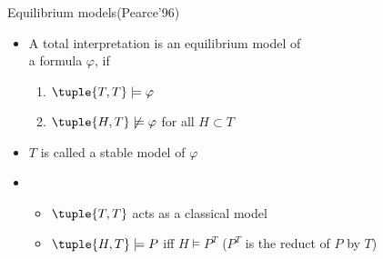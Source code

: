 \begin{frame}{Equilibrium models}{(Pearce'96)}
  \begin{itemize}
  \item A total interpretation  is an \alert{equilibrium model} of\\
    a formula $\varphi$,
    if
    \par
    \smallskip
    \begin{enumerate}\normalsize
    \item
      \(
      \tuple{T,T}\models\varphi
      \)
    \item
      \(
      \tuple{H,T}\not\models\varphi
      \)
      for all $H\subset T$
    \end{enumerate}
    \smallskip
  \item <2-> $T$ is called a \alert{stable model} of $\varphi$
    \bigskip
  \item<3-> 
    \begin{itemize}\normalsize
    \item $\tuple{T,T}$ acts as a classical model
    \item $\tuple{H,T} \models P$ iff $H \models P^T$ \hfill ($P^T$ is the reduct of $P$ by $T$)
    \end{itemize}
  \end{itemize}
\end{frame}
%
